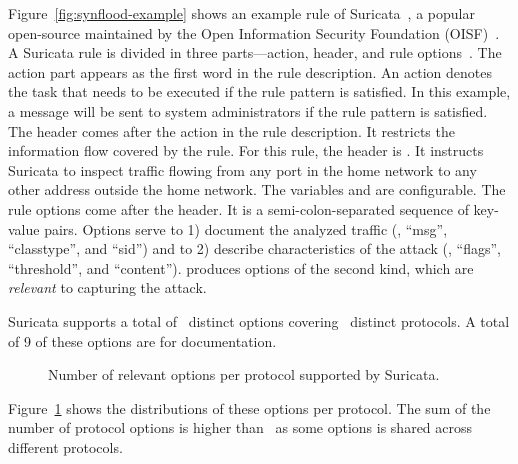 \documentclass[runningheads]{llncs}
\begin{document}
Figure~\ref{fig:synflood-example} shows an example rule of
Suricata~\cite{suricata}, a popular open-source \nids{} maintained by
the Open Information Security Foundation (OISF)~\cite{oisf}. A
Suricata rule is divided in three parts---action, header, and rule
options~\cite{suri-rule-format}. The action part appears as the first
word in the rule description. An action denotes the task that needs to
be executed if the rule pattern is satisfied. In this example, a
message will be sent to system administrators if the rule pattern is
satisfied. The header comes after the action in the rule
description. It restricts the information flow covered by the
rule. For this rule, the header is . It instructs Suricata to inspect 
traffic flowing from any port in the home network to any other address
outside the home network. The variables  and
 are configurable. The rule options come after
the header. It is a semi-colon-separated sequence of key-value
pairs. Options serve to 1) document the analyzed traffic (\eg{},
``msg'', ``classtype'', and ``sid'') and to 2) describe
characteristics of the attack (\eg, ``flags'', ``threshold'', and
``content''). \tname{} produces options of the second kind, which are
\emph{relevant} to capturing the attack.

Suricata supports a total of \totoptions\ distinct options covering
\numproto\ distinct protocols. A total of 9 of these options are for
documentation.
\begin{figure}
  \centering
  \vspace{-5ex}
  \vspace{-1ex}
  \caption{\label{fig:distribution-rules-protocol}Number of relevant
    options per protocol supported by Suricata.}
\end{figure}
 Figure~\ref{fig:distribution-rules-protocol} shows
the distributions of these options per protocol. The sum of
the number of protocol options is higher than \totoptions\ as some
options is shared across different protocols.
\end{document}
